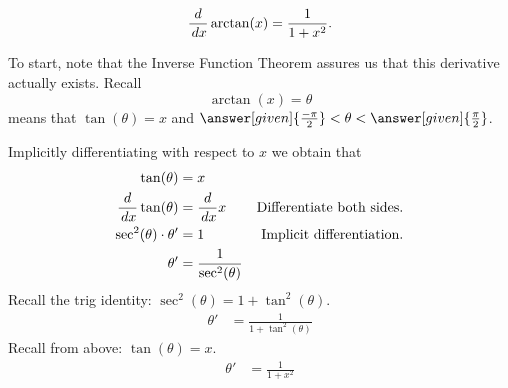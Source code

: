 \documentclass{ximera}
\begin{document}
\begin{theorem}
  \[
  \frac{d}{\,d x} \arctan(x) = \frac{1}{1+x^2}.
  \]
  \begin{explanation} 
     To start, note that the Inverse Function Theorem assures us that this
     derivative actually exists.
    Recall
    \[
    \arctan(x) = \theta
    \]
    means that $\tan(\theta) = x$ and $\answer[given]{\frac{-\pi}{2}}<
    \theta< \answer[given]{\frac{\pi}{2}}$. 
    
     Implicitly
    differentiating with respect to $x$ we obtain that
    \begin{align*}
      \tan(\theta) &= x\\
      \frac{d}{\,d x} \tan(\theta) &= \frac{d}{\,d x} x         &\text{Differentiate both sides.}\\
      \sec^2(\theta) \cdot \theta' &= 1   &\text{Implicit differentiation.}\\
      \theta' &= \frac{1}{\sec^2(\theta)} 
       \end{align*}
      Recall the trig identity:  $\sec^2(\theta)=1+\tan^2(\theta)$.\\
        \begin{align*}
          \theta' &= \frac{1}{1+\tan^2(\theta)} 
         \end{align*}
         Recall from above:  $\tan(\theta) = x$.\\
          \begin{align*}
          \theta' &= \frac{1}{1+x^2} 
         \end{align*}
        

\end{explanation}
\end{theorem}
\end{document}

